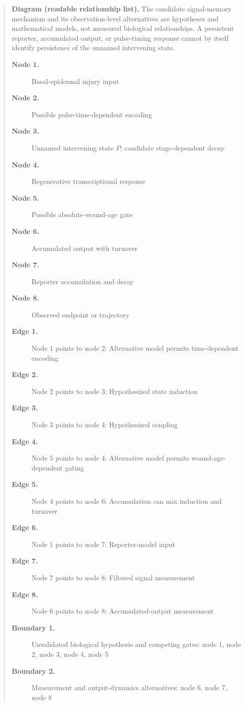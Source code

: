 \documentclass[11pt]{article}
\begin{document}
\begin{quote}
\textbf{Diagram (readable relationship list).} The candidate signal-memory mechanism and its observation-level alternatives are hypotheses and mathematical models, not measured biological relationships. A persistent reporter, accumulated output, or pulse-timing response cannot by itself identify persistence of the unnamed intervening state.
\begin{description}
\item[\textbf{Node 1.}] Basal-epidermal injury input
\item[\textbf{Node 2.}] Possible pulse-time-dependent encoding
\item[\textbf{Node 3.}] Unnamed intervening state $P$; candidate stage-dependent decay
\item[\textbf{Node 4.}] Regenerative transcriptional response
\item[\textbf{Node 5.}] Possible absolute-wound-age gate
\item[\textbf{Node 6.}] Accumulated output with turnover
\item[\textbf{Node 7.}] Reporter accumulation and decay
\item[\textbf{Node 8.}] Observed endpoint or trajectory
\item[\textbf{Edge 1.}] Node 1 points to node 2: Alternative model permits time-dependent encoding
\item[\textbf{Edge 2.}] Node 2 points to node 3: Hypothesized state induction
\item[\textbf{Edge 3.}] Node 3 points to node 4: Hypothesized coupling
\item[\textbf{Edge 4.}] Node 5 points to node 4: Alternative model permits wound-age-dependent gating
\item[\textbf{Edge 5.}] Node 4 points to node 6: Accumulation can mix induction and turnover
\item[\textbf{Edge 6.}] Node 1 points to node 7: Reporter-model input
\item[\textbf{Edge 7.}] Node 7 points to node 8: Filtered signal measurement
\item[\textbf{Edge 8.}] Node 6 points to node 8: Accumulated-output measurement
\item[\textbf{Boundary 1.}] Unvalidated biological hypothesis and competing gates: node 1, node 2, node 3, node 4, node 5
\item[\textbf{Boundary 2.}] Measurement and output-dynamics alternatives: node 6, node 7, node 8
\end{description}
\par{}
\end{quote}
\end{document}
